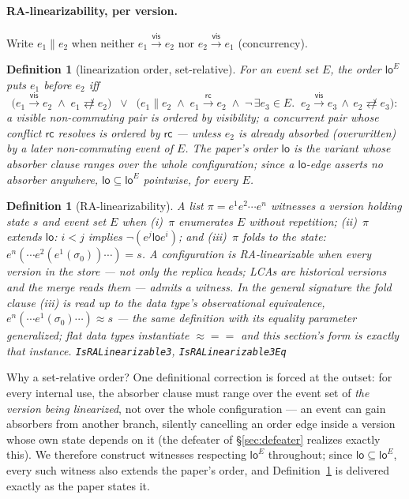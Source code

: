 \documentclass[11pt]{article}
\newtheorem{definition}[theorem]{Definition}
\newcommand{\vis}{\xrightarrow{\mathsf{vis}}}
\newcommand{\rc}{\xrightarrow{\mathsf{rc}}}
\newcommand{\ncomm}{\not\rightleftarrows}
\newcommand{\Sinit}{\sigma_0}
\newcommand{\loE}[1]{\mathsf{lo}^{#1}}
\newcommand{\lean}[1]{\texttt{#1}}
\newcommand{\eqobs}{\approx}
\begin{document}
\paragraph{RA-linearizability, per version.} Write $e_1 \parallel e_2$
when neither $e_1 \vis e_2$ nor $e_2 \vis e_1$ (concurrency).

\begin{definition}[linearization order, set-relative]
\label{def:lo}
For an event set $E$, the order $\loE{E}$ puts $e_1$ before $e_2$ iff
\[
\bigl(e_1 \vis e_2 \;\wedge\; e_1 \ncomm e_2\bigr)
\;\;\vee\;\;
\bigl(e_1 \parallel e_2 \;\wedge\; e_1 \rc e_2 \;\wedge\;
  \neg\,\exists e_3 \in E.\;\; e_2 \vis e_3 \,\wedge\, e_2 \ncomm e_3\bigr):
\]
a visible non-commuting pair is ordered by visibility; a concurrent pair
whose conflict $\mathsf{rc}$ resolves is ordered by $\mathsf{rc}$ ---
unless $e_2$ is already \emph{absorbed} (overwritten) by a later
non-commuting event of $E$. The paper's order $\mathsf{lo}$ is the
variant whose absorber clause ranges over the whole configuration; since
a $\mathsf{lo}$-edge asserts \emph{no absorber anywhere},
$\mathsf{lo} \subseteq \loE{E}$ pointwise, for every $E$.
\end{definition}

\begin{definition}[RA-linearizability]
\label{def:ralin}
A list $\pi = e^1 e^2 \cdots e^n$ \emph{witnesses} a version holding
state $s$ and event set $E$ when (i)~$\pi$ enumerates $E$ without
repetition; (ii)~$\pi$ \emph{extends} $\mathsf{lo}$: $i < j$ implies
$\neg(e^j \mathrel{\mathsf{lo}} e^i)$; and (iii)~$\pi$ \emph{folds} to
the state: $e^n(\cdots e^2(e^1(\Sinit))\cdots) = s$. A configuration is
\emph{RA-linearizable} when \emph{every version in the store} --- not
only the replica heads; LCAs are historical versions and the merge reads
them --- admits a witness. In the general signature the fold clause
(iii) is read up to the data type's observational equivalence,
$e^n(\cdots e^1(\Sinit)\cdots) \eqobs s$ --- the same definition with
its equality parameter generalized; flat data types instantiate
${\eqobs} = {=}$ and this section's form is exactly that instance.
\hfill\lean{IsRALinearizable3}, \lean{IsRALinearizable3Eq}
\end{definition}

Why a set-relative order? One definitional correction is forced at the
outset: for every internal use, the absorber clause must range over the
event set of \emph{the version being linearized}, not over the whole
configuration --- an event can gain absorbers from another branch,
silently cancelling an order edge inside a version whose own state
depends on it (the defeater of \S\ref{sec:defeater} realizes exactly
this). We therefore construct witnesses respecting $\loE{E}$ throughout;
since $\mathsf{lo} \subseteq \loE{E}$, every such witness also extends
the paper's order, and Definition~\ref{def:ralin} is delivered exactly
as the paper states it.
\end{document}
